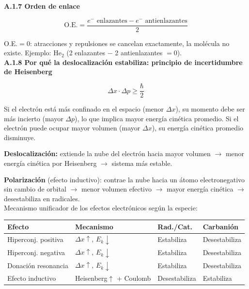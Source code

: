 \label{sec:anexo:tom:orden}
\textbf{A.1.7 Orden de enlace}

\[
\text{O.E.} = \frac{e^- \text{ enlazantes} - e^- \text{ antienlazantes}}{2}
\]

O.E.$=0$: atracciones y repulsiones se cancelan exactamente, la molécula no existe.
Ejemplo: He$_2$ (2 enlazantes $-$ 2 antienlazantes $= 0$). \\

\label{sec:anexo:tom:heisenberg}
\textbf{A.1.8 Por qué la deslocalización estabiliza: principio de incertidumbre de Heisenberg}

\[
\Delta x \cdot \Delta p \geq \frac{\hbar}{2}
\]

Si el electrón está más confinado en el espacio (menor $\Delta x$), su momento debe ser más
incierto (mayor $\Delta p$), lo que implica mayor energía cinética promedio. Si el electrón puede
ocupar mayor volumen (mayor $\Delta x$), su energía cinética promedio disminuye.

\textbf{Deslocalización:} extiende la nube del electrón hacia mayor volumen $\rightarrow$ menor
energía cinética por Heisenberg $\rightarrow$ sistema más estable.

\textbf{Polarización} (efecto inductivo): contrae la nube hacia un átomo electronegativo sin cambio
de orbital $\rightarrow$ menor volumen efectivo $\rightarrow$ mayor energía cinética $\rightarrow$
desestabiliza en radicales. \\

Mecanismo unificador de los efectos electrónicos según la especie:

\begin{center}
\small
\begin{tabular}{p{3.5cm}p{3cm}p{2cm}p{2cm}}
\hline
\textbf{Efecto} & \textbf{Mecanismo} & \textbf{Rad./Cat.} & \textbf{Carbanión} \\
\hline
Hiperconj. positiva & $\Delta x\uparrow$, $E_k\downarrow$ & Estabiliza & Desestabiliza \\
Hiperconj. negativa & $\Delta x\uparrow$, $E_k\downarrow$ & Estabiliza & Desestabiliza \\
Donación resonancia & $\Delta x\uparrow$, $E_k\downarrow$ & Estabiliza & Desestabiliza \\
Efecto inductivo & Heisenberg$\uparrow$ + Coulomb & Desestabiliza & Estabiliza \\
\hline
\end{tabular}
\normalsize
\end{center}

